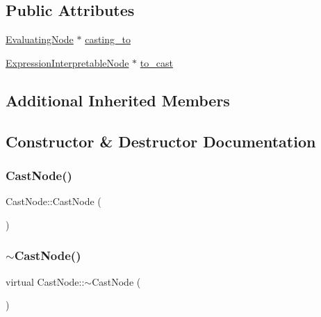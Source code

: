 \subsection*{Public Attributes}
\begin{DoxyCompactItemize}
\item 
\hyperlink{classEvaluatingNode}{Evaluating\+Node} $\ast$ \hyperlink{classCastNode_adc7612dd690f94026adeea0d98970b57}{casting\+\_\+to}
\item 
\hyperlink{classExpressionInterpretableNode}{Expression\+Interpretable\+Node} $\ast$ \hyperlink{classCastNode_a01fc0556ce65230a77941f1519b72769}{to\+\_\+cast}
\end{DoxyCompactItemize}
\subsection*{Additional Inherited Members}


\subsection{Constructor \& Destructor Documentation}
\mbox{\label{classCastNode_aacc7aea8e67a26de47f9a9a175cad3e2}} 
\subsubsection{\texorpdfstring{Cast\+Node()}{CastNode()}}
{\footnotesize\ttfamily Cast\+Node\+::\+Cast\+Node (\begin{DoxyParamCaption}{ }\end{DoxyParamCaption})}

\mbox{\label{classCastNode_a358bc9d180542920fced2b7f35ef3f9f}} 
\subsubsection{\texorpdfstring{$\sim$\+Cast\+Node()}{~CastNode()}}
{\footnotesize\ttfamily virtual Cast\+Node\+::$\sim$\+Cast\+Node (\begin{DoxyParamCaption}{ }\end{DoxyParamCaption})\hspace{0.3cm}{\ttfamily [virtual]}}



